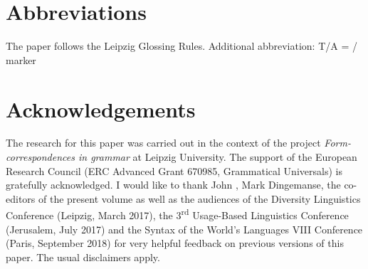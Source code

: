 \documentclass[output=paper]{langsci/langscibook}
\begin{document}
\section*{Abbreviations}

The paper follows the Leipzig Glossing Rules. Additional abbreviation: T/A = / marker

\section*{Acknowledgements}

The research for this paper was carried out in the context of the project \textit{Form- correspondences in grammar} at Leipzig University. The support of the European Research Council (ERC Advanced Grant 670985, Grammatical Universals) is gratefully acknowledged. I would like to thank John , Mark Dingemanse, the co-editors of the present volume as well as the audiences of the Diversity Linguistics Conference (Leipzig,  {March 2017}), the 3\textsuperscript{rd} Usage-Based Linguistics Conference (Jerusalem,  {July 2017}) and the Syntax of the World’s Languages VIII Conference (Paris,  {September 2018}) for very helpful feedback on previous versions of this paper. The usual disclaimers apply.

\sloppy
\printbibliography[heading=subbibliography,notkeyword=this] 
\end{document}
